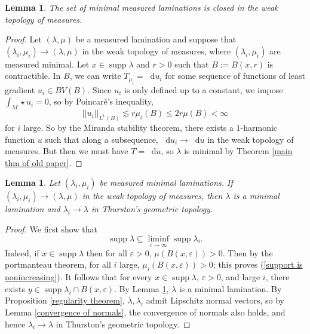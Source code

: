 \documentclass[reqno,11pt]{amsart}
\newcommand*\dif{\mathop{}\!\mathrm{d}}
\DeclareMathOperator{\supp}{supp}
\newtheorem{lemma}[theorem]{Lemma}
\theoremstyle{definition}
\numberwithin{equation}{section}
\begin{document}
\begin{lemma}\label{limits of measured geodesic lams are geodesic}
	The set of minimal measured laminations is closed in the weak topology of measures.
\end{lemma}
\begin{proof}
Let $(\lambda, \mu)$ be a measured lamination and suppose that $(\lambda_i, \mu_i) \to (\lambda, \mu)$ in the weak topology of measures, where $(\lambda_i, \mu_i)$ are measured minimal.
Let $x \in \supp \lambda$ and $r > 0$ such that $B := B(x, r)$ is contractible.
In $B$, we can write $T_{\mu_i} = \dif u_i$ for some sequence of functions of least gradient $u_i \in BV(B)$.
Since $u_i$ is only defined up to a constant, we impose $\int_M \star u_i = 0$, so by Poincar\'e's inequality,
$$||u_i||_{L^1(B)} \lesssim r\mu_i(B) \leq 2r \mu(B) < \infty$$
for $i$ large.
So by the Miranda stability theorem, there exists a $1$-harmonic function $u$ such that along a subsequence, $\dif u_i \to \dif u$ in the weak topology of measures.
But then we must have $T = \dif u$, so $\lambda$ is minimal by Theorem \ref{main thm of old paper}.
\end{proof}

\begin{lemma}\label{measured implies Thurston}
Let $(\lambda_i, \mu_i)$ be measured minimal laminations.
If $(\lambda_i, \mu_i) \to (\lambda, \mu)$ in the weak topology of measures, then $\lambda$ is a minimal lamination and $\lambda_i \to \lambda$ in Thurston's geometric topology.
\end{lemma}
\begin{proof}
We first show that
\begin{equation}\label{support is nonincreasing}
	\supp \lambda \subseteq \liminf_{i \to \infty} \supp \lambda_i.
\end{equation}
Indeed, if $x \in \supp \lambda$ then for all $\varepsilon > 0$, $\mu(B(x, \varepsilon)) > 0$.
Then by the portmanteau theorem, for all $i$ large, $\mu_i(B(x, \varepsilon)) > 0$; this proves (\ref{support is nonincreasing}).
It follows that for every $x \in \supp \lambda$, $\varepsilon > 0$, and large $i$, there exists $y \in \supp \lambda_i \cap B(x, \varepsilon)$.
By Lemma \ref{limits of measured geodesic lams are geodesic}, $\lambda$ is a minimal lamination.
By Proposition \ref{regularity theorem}, $\lambda, \lambda_i$ admit Lipschitz normal vectors, so by Lemma \ref{convergence of normals}, the convergence of normals also holds, and hence $\lambda_i \to \lambda$ in Thurston's geometric topology.
\end{proof}
\end{document}
